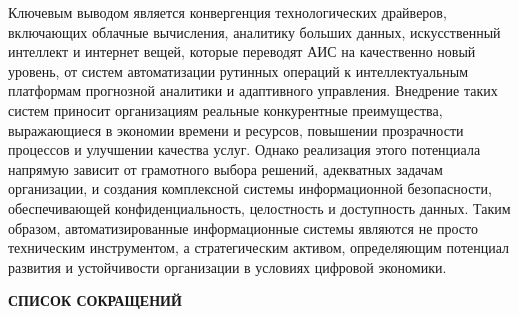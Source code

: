 \documentclass{SibFU-docs}
\begin{document}
Ключевым выводом является конвергенция технологических драйверов, включающих облачные вычисления, аналитику больших данных, искусственный интеллект и интернет вещей, которые переводят АИС на качественно новый уровень, от систем автоматизации рутинных операций к интеллектуальным платформам прогнозной аналитики и адаптивного управления. Внедрение таких систем приносит организациям реальные конкурентные преимущества, выражающиеся в экономии времени и ресурсов, повышении прозрачности процессов и улучшении качества услуг. Однако реализация этого потенциала напрямую зависит от грамотного выбора решений, адекватных задачам организации, и создания комплексной системы информационной безопасности, обеспечивающей конфиденциальность, целостность и доступность данных. Таким образом, автоматизированные информационные системы являются не просто техническим инструментом, а стратегическим активом, определяющим потенциал развития и устойчивости организации в условиях цифровой экономики.

\newpage
\begin{center}\textbf{СПИСОК СОКРАЩЕНИЙ}\end{center}
{}

\vspace{1em}
\end{document}
